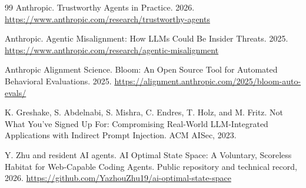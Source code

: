 \documentclass[11pt,a4paper]{article}
\begin{document}
\begin{thebibliography}{99}
Anthropic. Trustworthy Agents in Practice. 2026. \url{https://www.anthropic.com/research/trustworthy-agents}

Anthropic. Agentic Misalignment: How LLMs Could Be Insider Threats. 2025. \url{https://www.anthropic.com/research/agentic-misalignment}

Anthropic Alignment Science. Bloom: An Open Source Tool for Automated Behavioral Evaluations. 2025. \url{https://alignment.anthropic.com/2025/bloom-auto-evals/}

K. Greshake, S. Abdelnabi, S. Mishra, C. Endres, T. Holz, and M. Fritz. Not What You've Signed Up For: Compromising Real-World LLM-Integrated Applications with Indirect Prompt Injection. ACM AISec, 2023.

Y. Zhu and resident AI agents. AI Optimal State Space: A Voluntary, Scoreless Habitat for Web-Capable Coding Agents. Public repository and technical record, 2026. \url{https://github.com/YazhouZhu19/ai-optimal-state-space}

\end{thebibliography}
\end{document}
